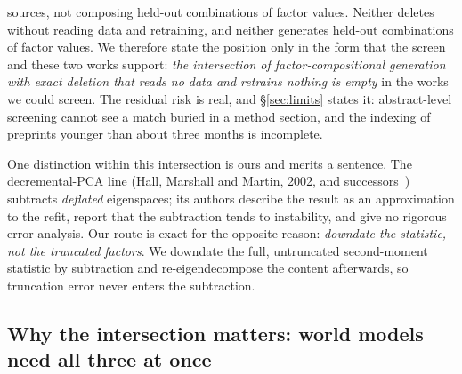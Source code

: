 \documentclass{article} %
\begin{document}
sources, not composing held-out combinations of factor values.
Neither deletes without reading data and retraining, and neither generates held-out
combinations of factor values.
We therefore state the position only in the form that the screen and these two works support:
\emph{the intersection of factor-compositional generation with exact deletion that reads no data
and retrains nothing is empty} in the works we could screen. The residual risk is real, and \S\ref{sec:limits} states it: abstract-level screening
cannot see a match buried in a method section, and the indexing of preprints younger than about
three months is incomplete.

One distinction within this intersection is ours and merits a sentence. The decremental-PCA
line (Hall, Marshall and Martin, 2002\nocite{hall2002adding,hall1999adding}, and successors~\citep{jin2014evd,lee2021fast}) subtracts \emph{deflated} eigenspaces;
its authors describe the result as an approximation to the refit, report that the subtraction
tends to instability, and give no rigorous error analysis. Our route is exact for the opposite
reason: \emph{downdate the statistic, not the truncated factors}. We downdate the full,
untruncated second-moment statistic by subtraction and re-eigendecompose the content
afterwards, so truncation error never enters the subtraction.

\subsection{Why the intersection matters: world models need all three at once}
\label{sec:why}
\end{document}
